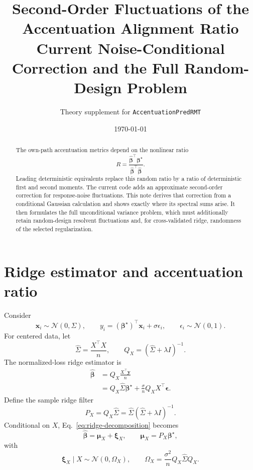 \documentclass[11pt]{article}
\title{Second-Order Fluctuations of the Accentuation Alignment Ratio\\
Current Noise-Conditional Correction and the Full Random-Design Problem}
\author{Theory supplement for \texttt{AccentuationPredRMT}}
\date{\today}
\newcommand{\bhat}{\widehat{\bm\beta}}
\newcommand{\bstar}{\bm\beta^\star}
\newcommand{\Shat}{\widehat\Sigma}
\begin{document}
\maketitle

\begin{abstract}
The own-path accentuation metrics depend on the nonlinear ratio
\[
R=\frac{\bhat^\top\bstar}{\bhat^\top\bhat}.
\]
Leading deterministic equivalents replace this random ratio by a ratio of
deterministic first and second moments.  The current code adds an approximate
second-order correction for response-noise fluctuations.  This note derives
that correction from a conditional Gaussian calculation and shows exactly
where its spectral sums arise.  It then formulates the full unconditional
variance problem, which must additionally retain random-design resolvent
fluctuations and, for cross-validated ridge, randomness of the selected
regularization.
\end{abstract}

\section{Ridge estimator and accentuation ratio}

Consider
\begin{equation}
  \bm x_i\sim\mathcal N(0,\Sigma),\qquad
  y_i=(\bstar)^\top\bm x_i+\sigma\epsilon_i,
  \qquad \epsilon_i\sim\mathcal N(0,1).
\end{equation}
For centered data, let
\begin{equation}
  \Shat=\frac{X^\top X}{n},\qquad
  Q_X=(\Shat+\lambda I)^{-1}.
\end{equation}
The normalized-loss ridge estimator is
\begin{align}
  \bhat
    &=Q_X\frac{X^\top\bm y}{n}\\
    &=Q_X\Shat\bstar
      +\frac{\sigma}{n}Q_XX^\top\bm\epsilon.
  \label{eq:ridge-decomposition}
\end{align}
Define the sample ridge filter
\begin{equation}
  P_X=Q_X\Shat=\Shat(\Shat+\lambda I)^{-1}.
\end{equation}
Conditional on \(X\), Eq.~\eqref{eq:ridge-decomposition} becomes
\begin{equation}
  \bhat=\bm\mu_X+\bm\xi_X,
  \qquad
  \bm\mu_X=P_X\bstar,
  \label{eq:conditional-decomposition}
\end{equation}
with
\begin{equation}
  \bm\xi_X\mid X\sim\mathcal N(0,\Omega_X),\qquad
  \Omega_X=\frac{\sigma^2}{n}Q_X\Shat Q_X.
  \label{eq:conditional-covariance}
\end{equation}
\end{document}
